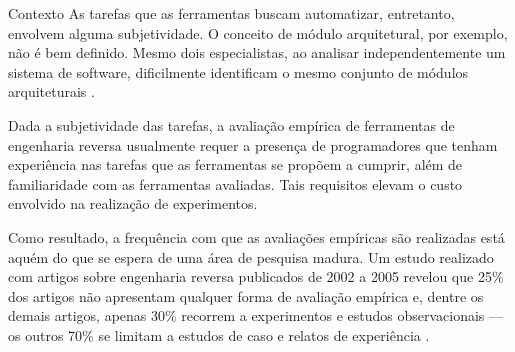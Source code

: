 \begin{section}{Contexto}
	As tarefas que as ferramentas buscam automatizar, entretanto, envolvem alguma subjetividade. O conceito de módulo arquitetural, por exemplo, não é bem definido. Mesmo dois especialistas, ao analisar independentemente um sistema de software, dificilmente identificam o mesmo conjunto de módulos arquiteturais \cite{Koschke2000}. %

	Dada a subjetividade das tarefas, a avaliação empírica de ferramentas de engenharia reversa usualmente requer a presença de programadores que tenham experiência nas tarefas que as ferramentas se propõem a cumprir, além de familiaridade com as ferramentas avaliadas. Tais requisitos elevam o custo envolvido na realização de experimentos. %
	 
	
	
	Como resultado, a frequência com que as avaliações empíricas são realizadas está aquém do que se espera de uma área de pesquisa madura. Um estudo realizado com artigos sobre engenharia reversa publicados de 2002 a 2005 revelou que 25\% dos artigos não apresentam qualquer forma de avaliação empírica e, dentre os demais artigos, apenas 30\% recorrem a experimentos e estudos observacionais --- os outros 70\% se limitam a estudos de caso e relatos de experiência \cite{Tonella2007}.




\end{section}
